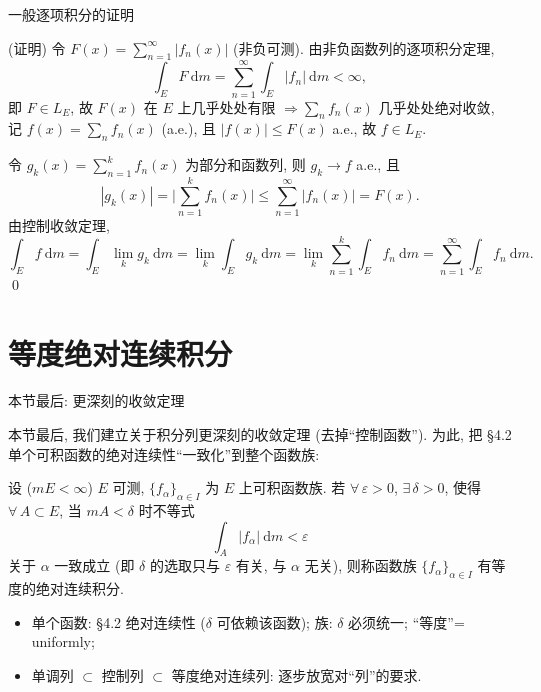 
\begin{frame}{一般逐项积分的证明}

\startproof[bg=yellow, fg=red](证明)
令 $F(x) = \sum_{n=1}^{\infty} |f_n(x)|$ (非负可测). 由非负函数列的逐项积分定理,
\[
\int_E F ~ \mathrm{d} m = \sum_{n=1}^{\infty} \int_E |f_n| ~ \mathrm{d} m < \infty,
\]
即 $F \in L_E$, 故 $F(x)$ 在 $E$ 上几乎处处有限
$\Longrightarrow \sum_n f_n(x)$ 几乎处处\alert{绝对收敛}, 记 $f(x) = \sum_n f_n(x)$ (a.e.),
且 $|f(x)| \leqslant F(x)$ a.e., 故 $f \in L_E$.

\pause

令 $g_k(x) = \sum_{n=1}^{k} f_n(x)$ 为部分和函数列, 则 $g_k \to f$ a.e., 且
\[
|g_k(x)| = \Big| \sum_{n=1}^{k} f_n(x) \Big|
\leqslant \sum_{n=1}^{\infty} |f_n(x)| = F(x) .
\]
由\alert{控制收敛定理},
\[
\int_E f ~ \mathrm{d} m
= \int_E \lim_k g_k ~ \mathrm{d} m
= \lim_k \int_E g_k ~ \mathrm{d} m
= \lim_k \sum_{n=1}^{k} \int_E f_n ~ \mathrm{d} m
= \sum_{n=1}^{\infty} \int_E f_n ~ \mathrm{d} m .
\]
\qed

\end{frame}


\section[等度积分]{等度绝对连续积分}


\begin{frame}{本节最后: 更深刻的收敛定理}

本节最后, 我们建立关于积分列\alert{更深刻}的收敛定理 (去掉``控制函数''). 为此, 把 \S 4.2
单个可积函数的绝对连续性``一致化''到整个函数族:

\begin{Def}[等度绝对连续积分]
设 ($mE < \infty$) $E$ 可测, $\{f_\alpha\}_{\alpha \in I}$ 为 $E$ 上可积函数族.
若 $\forall\, \varepsilon > 0$, $\exists\, \delta > 0$, 使得 $\forall\, A \subset E$,
当 $mA < \delta$ 时不等式
\[
\int_A |f_\alpha| ~ \mathrm{d} m < \varepsilon
\]
关于 $\alpha$ \alert{一致成立} (即 $\delta$ 的选取只与 $\varepsilon$ 有关, 与 $\alpha$ 无关),
则称函数族 $\{f_\alpha\}_{\alpha \in I}$ 有\alert{等度的绝对连续积分}.
\end{Def}

\pause

\begin{itemize}
\item 单个函数: \S 4.2 绝对连续性 ($\delta$ 可依赖该函数); 族: $\delta$ 必须统一;
  ``等度''= uniformly;
\item 单调列 $\subset$ 控制列 $\subset$ 等度绝对连续列: 逐步放宽对``列''的要求.
\end{itemize}

\end{frame}

